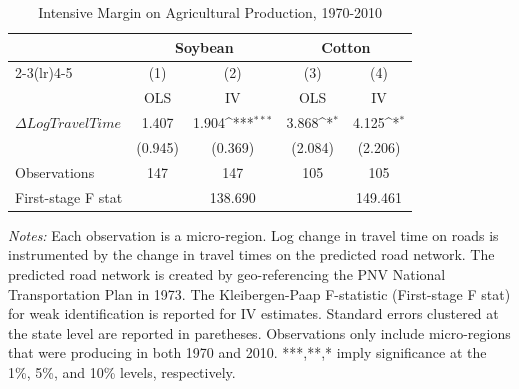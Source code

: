 \begin{table}[htbp]\centering
\def\sym#1{\ifmmode^{#1}\else\(^{#1}\)\fi}
\begingroup
\renewcommand{\arraystretch}{1.3}
\caption{Intensive Margin on Agricultural Production, 1970-2010}
\begin{tabular}{l*{4}{c}}
\hline\hline
                    &\multicolumn{2}{c}{Soybean}                &\multicolumn{2}{c}{Cotton}                 \\\cmidrule(lr){2-3}\cmidrule(lr){4-5}
                    &\multicolumn{1}{c}{(1)}         &\multicolumn{1}{c}{(2)}         &\multicolumn{1}{c}{(3)}         &\multicolumn{1}{c}{(4)}         \\
                    &         OLS         &          IV         &         OLS         &          IV         \\
\hline
$\Delta Log Travel Time$&       1.407         &       1.904\sym{***}&       3.868\sym{*}  &       4.125\sym{*}  \\
                    &     (0.945)         &     (0.369)         &     (2.084)         &     (2.206)         \\
\hline
Observations        &         147         &         147         &         105         &         105         \\
First-stage F stat  &                     &     138.690         &                     &     149.461         \\
\hline\hline
\end{tabular}
\endgroup
\begin{minipage}{11cm}
    \vspace{0.1cm}
    {\footnotesize \textit{Notes: }  Each observation is a micro-region. Log change in travel time on roads is instrumented by the change in travel times on the predicted road network. The predicted road network is created by geo-referencing the PNV National Transportation Plan in 1973. The Kleibergen-Paap F-statistic (First-stage F stat) for weak identification is reported for IV estimates. Standard errors clustered at the state level are reported in paretheses. Observations only include micro-regions that were producing in both 1970 and 2010. ***,**,* imply significance at the 1\%, 5\%, and 10\% levels, respectively.}
\end{minipage}
\end{table}

